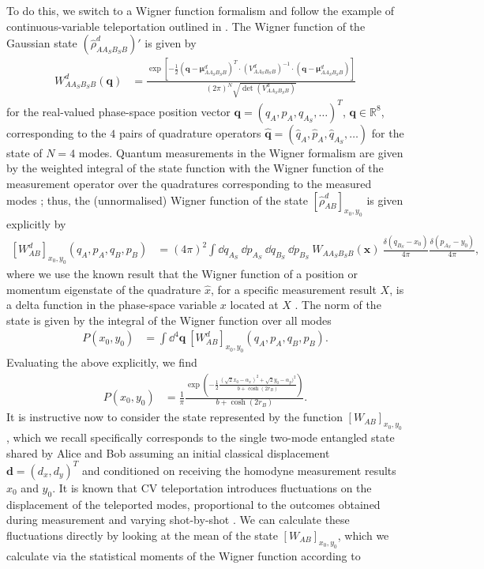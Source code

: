 \documentclass[%
 reprint,
 superscriptaddress,
 amsmath,
 amssymb,
 aps,
 pra,
]{revtex4-2}
\begin{document}
\begin{widetext}
To do this, we switch to a Wigner function formalism and follow the example of continuous-variable teleportation outlined in \cite{braunstein_quantum_2005}. The Wigner function of the Gaussian state $(\hat \rho_{AA_SB_SB}^d)'$ is given by \cite{weedbrook_gaussian_2012}
\begin{align}
    W_{AA_SB_SB}^d(\bm{q}) &= \frac{\exp \left[-\frac{1}{2} (\bm{q} - \bm{\mu}_{AA_SB_SB}^d)^T \cdot (V_{AA_SB_SB}^d)^{-1} \cdot (\bm{q} - \bm{\mu}_{AA_SB_SB}^d) \right]}{(2\pi)^N \sqrt{\det (V_{AA_SB_SB}^d)}}
\end{align}
for the real-valued phase-space position vector $\bm{q} = (q_A,p_A,q_{A_S}, \dots)^T$, $\bm{q} \in \mathbb{R}^{8}$, corresponding to the $4$ pairs of quadrature operators $\bm{\hat q} = (\hat q_A, \hat p_A, \hat q_{A_S}, \dots)$ for the state of $N = 4$ modes. Quantum measurements in the Wigner formalism are given by the weighted integral of the state function with the Wigner function of the measurement operator over the quadratures corresponding to the measured modes \cite{olivares_quantum_2012}; thus, the (unnormalised) Wigner function of the state $\left[ \hat \rho_{AB}^d \right]_{x_0, y_0}$ is given explicitly by
\begin{align}
    \left[ W_{AB}^d \right]_{x_0,y_0}(q_A, p_A, q_B, p_B) &= (4\pi)^2 \int \dd q_{A_S} \ \dd p_{A_S} \ \dd q_{B_S} \ \dd p_{B_S} \ W_{AA_SB_SB}(\bm{x}) \ \frac{\delta(q_{B_S} - x_0)}{4\pi} \frac{\delta(p_{A_S} - y_0)}{4\pi},
\end{align}
where we use the known result that the Wigner function of a position or momentum eigenstate of the quadrature $\hat x$, for a specific measurement result $X$, is a delta function in the phase-space variable $x$ located at $X$ \cite{curtright_concise_2014}. The norm of the state is given by the integral of the Wigner function over all modes
\begin{align}
    P(x_0,y_0) &= \int \dd^4 \bm{q} \ \left[ W_{AB}^d \right]_{x_0,y_0}(q_A, p_A, q_B, p_B).
\end{align}
Evaluating the above explicitly, we find
\begin{align}
    P(x_0, y_0) &= \frac{1}{\pi}\frac{\exp \left(-\frac{1}{2}\frac{(\sqrt{2}x_0-\alpha_x)^2+\sqrt{2}y_0-\alpha_y)^2}{b+\cosh (2 r_B)}\right)}{b+\cosh(2r_B)}.
\end{align}
It is instructive now to consider the state represented by the function $\left[ W_{AB} \right]_{x_0,y_0}$, which we recall specifically corresponds to the single two-mode entangled state shared by Alice and Bob assuming an initial classical displacement $\bm{d} = (d_x, d_y)^T$ and conditioned on receiving the homodyne measurement results $x_0$ and $y_0$. It is known that CV teleportation introduces fluctuations on the displacement of the teleported modes, proportional to the outcomes obtained during measurement and varying shot-by-shot \cite{eisert_distilling_2002, braunstein_quantum_2005}. We can calculate these fluctuations directly by looking at the mean of the state $\left[ W_{AB} \right]_{x_0,y_0}$, which we calculate via the statistical moments of the Wigner function according to \cite{olivares_quantum_2012}

\end{widetext}
\end{document}
